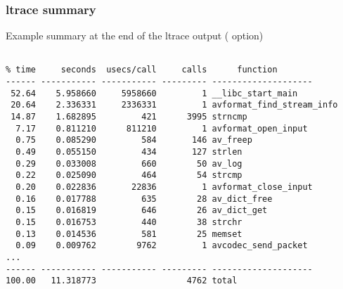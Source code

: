 \begin{frame}[fragile]
  \frametitle{ltrace summary}
  Example summary at the end of the ltrace output ( option)
  \scriptsize
  \begin{block}{}
\begin{verbatim}

% time     seconds  usecs/call     calls      function
------ ----------- ----------- --------- --------------------
 52.64    5.958660     5958660         1 __libc_start_main
 20.64    2.336331     2336331         1 avformat_find_stream_info
 14.87    1.682895         421      3995 strncmp
  7.17    0.811210      811210         1 avformat_open_input
  0.75    0.085290         584       146 av_freep
  0.49    0.055150         434       127 strlen
  0.29    0.033008         660        50 av_log
  0.22    0.025090         464        54 strcmp
  0.20    0.022836       22836         1 avformat_close_input
  0.16    0.017788         635        28 av_dict_free
  0.15    0.016819         646        26 av_dict_get
  0.15    0.016753         440        38 strchr
  0.13    0.014536         581        25 memset
  0.09    0.009762        9762         1 avcodec_send_packet
...
------ ----------- ----------- --------- --------------------
100.00   11.318773                  4762 total
\end{verbatim}
  \end{block}
\end{frame}
